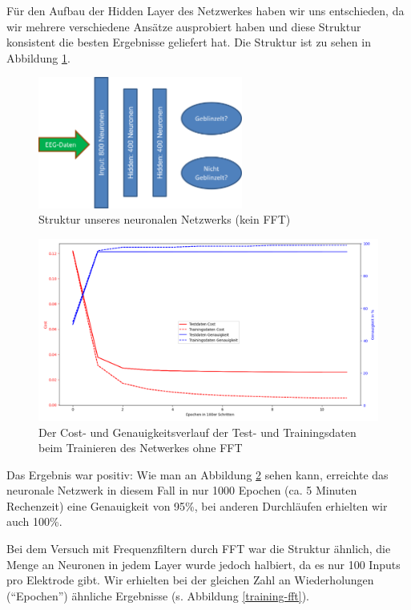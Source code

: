 \documentclass[11pt]{scrartcl}
\begin{document}
	Für den Aufbau der Hidden Layer des Netzwerkes haben wir uns entschieden, da wir mehrere verschiedene Ansätze ausprobiert haben und diese Struktur konsistent die besten Ergebnisse geliefert hat. Die Struktur ist zu sehen in Abbildung \ref{NetzStruktur}.

	\begin{figure}[H]
		\centering
		\includegraphics[width=0.6\textwidth]{pictures/netzwerk-struktur.png}
		\caption{Struktur unseres neuronalen Netzwerks (kein FFT)}
		\label{NetzStruktur}
	\end{figure}

	\begin{figure}[h!]
		\includegraphics[width=\textwidth]{pictures/training-nofft.png}
		\caption{Der Cost- und Genauigkeitsverlauf der Test- und Trainingsdaten beim Trainieren des Netwerkes ohne FFT}
		\label{training-nofft}
	\end{figure}

	Das Ergebnis war positiv: Wie man an Abbildung \ref{training-nofft} sehen kann, erreichte das neuronale Netzwerk in diesem Fall in nur 1000 Epochen (ca. 5 Minuten Rechenzeit) eine Genauigkeit von 95\%, bei anderen Durchläufen erhielten wir auch 100\%.

	Bei dem Versuch mit Frequenzfiltern durch FFT war die Struktur ähnlich, die Menge an Neuronen in jedem Layer wurde jedoch halbiert, da es nur 100 Inputs pro Elektrode gibt. Wir erhielten bei der gleichen Zahl an Wiederholungen (\enquote{Epochen}) ähnliche Ergebnisse (s. Abbildung \ref{training-fft}).
\end{document}
